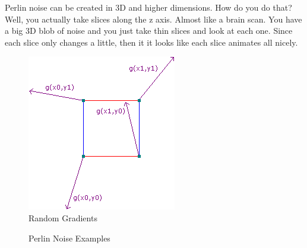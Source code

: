 Perlin noise can be created in 3D and higher dimensions. How do you do that? Well, you actually take slices along the z axis. Almost like a brain scan. You have a big 3D blob of noise and you just take thin slices and look at each one. Since each slice only changes a little, then it it looks like each slice animates all nicely.

\begin{figure}
	\center
	\includegraphics[scale=0.5]{images/gradients.png}
	\caption{Random Gradients}
	\label{fig:randomGradients}
\end{figure}
\begin{figure}
	\center
	\caption{Perlin Noise Examples}
	\label{fig:perlinEg}
\end{figure}

